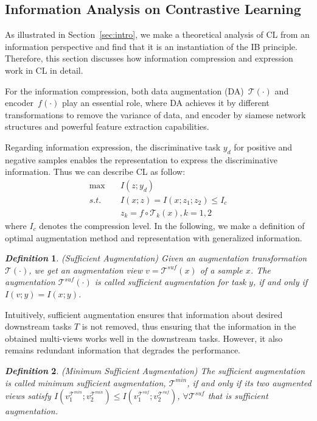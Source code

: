 \documentclass[10pt,twocolumn,letterpaper]{article}
\newtheorem{myDef}{\textit{Definition}}
\begin{document}
\subsection{Information Analysis on Contrastive Learning}
\label{sec:IBCL}
As illustrated in Section~\ref{sec:intro}, we make a theoretical analysis of CL from an information perspective and find that it is an instantiation of the IB principle. Therefore, this section discusses how information compression and expression work in CL in detail.

For the information compression, both data augmentation (DA)~$\mathcal{T}(\cdot)$ and encoder~$f(\cdot)$ play an essential role, where DA achieves it by different transformations to remove the variance of data, and encoder by siamese network structures and powerful feature extraction capabilities.

Regarding information expression, the discriminative task $y_d$ for positive and negative samples enables the representation to express the discriminative information. Thus we can describe CL as follow:
\begin{align}
    \max &\quad I(z;y_{d}) \label{eq:con_ib} \\ 
    s.t. &\quad I(x;z) = I(x;z_1;z_2)\le I_c \\
    &\quad z_k = f\circ\mathcal{T}_{k}(x), k=1,2
\end{align}
where $I_c$ denotes the compression level. 
In the following, we make a definition of optimal augmentation method and representation with generalized information.

\begin{myDef}
(Sufficient Augmentation) Given an augmentation transformation $\mathcal{T}(\cdot)$, we get an augmentation view $v=\mathcal{T}^{suf}(x)$ of a sample $x$. The augmentation $\mathcal{T}^{suf}(\cdot)$ is called sufficient augmentation for task $y$, if and only if $I(v;y)=I(x;y)$.
\end{myDef}

Intuitively, sufficient augmentation ensures that information about desired downstream tasks $T$ is not removed, thus ensuring that the information in the obtained multi-views works well in the downstream tasks. However, it also remains redundant information that degrades the performance.

\begin{myDef}\label{min_suff_aug}
(Minimum Sufficient Augmentation) The sufficient augmentation is called minimum sufficient augmentation, $\mathcal{T}^{min}$, if and only if its two augmented views satisfy  $I(v_1^{\mathcal{T}^{min}};v_2^{\mathcal{T}^{min}})\le I(v_1^{\mathcal{T}^{suf}};v_2^{\mathcal{T}^{suf}})$, $\forall \mathcal{T}^{suf}$ that is sufficient augmentation.
\end{myDef}
\end{document}
